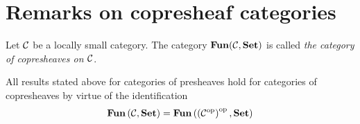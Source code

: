 \section{Remarks on copresheaf categories}

\begin{definition}
Let ${\mathcal C}$ be a locally small category. The category $\mathbf{Fun}({\mathcal C},\mathbf{Set})$ is called \textit{the category of copresheaves on ${\mathcal C}$}.
\end{definition}
\noindent
All results stated above for categories of presheaves hold for categories of copresheaves by virtue of the identification 
$$\mathbf{Fun}\left({\mathcal C},\mathbf{Set}\right) = \mathbf{Fun}\left(\left({\mathcal C}^{\mathrm{op}}\right)^{\mathrm{op}},\mathbf{Set}\right)$$



 































































\small



